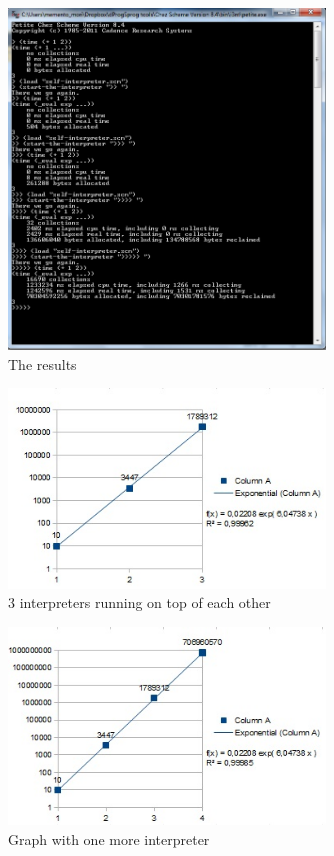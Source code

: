 \documentclass{article}
\begin{document}
\begin{figure}[h!]
  \caption{The results}
    \includegraphics[width=0.75\textwidth]{HanusResults}
\end{figure}

\begin{figure}[h!]
  \caption{3 interpreters running on top of each other}
  \centering
    \includegraphics[width=0.75\textwidth]{HanusGraf3}
\end{figure}

\begin{figure}[h!]
  \caption{Graph with one more interpreter}
  \centering
    \includegraphics[width=0.75\textwidth]{HanusGraf4}
\end{figure}
\end{document}
